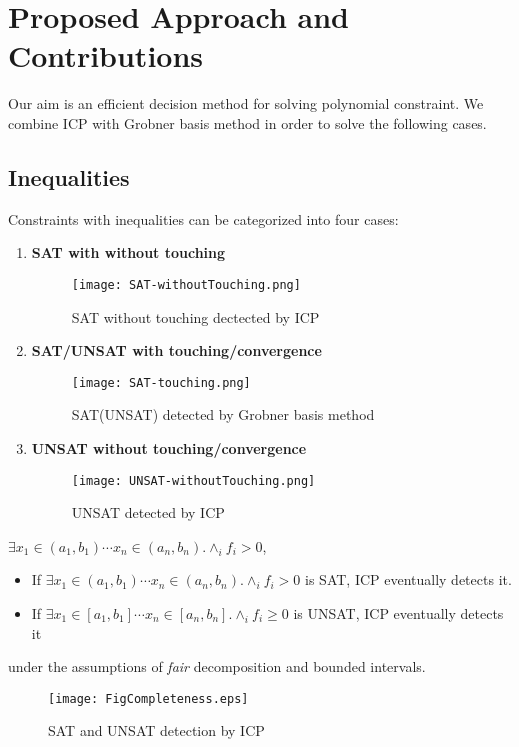 \section{Proposed Approach and Contributions}
Our aim is an efficient decision method for solving polynomial constraint. We combine ICP with Grobner basis method in order to solve the following cases.
\subsection{Inequalities}
Constraints with inequalities can be categorized into four cases:
\begin{enumerate}
\item \textbf{SAT with without touching}
\begin{figure}[ht]
\centering
\texttt{[image: SAT-withoutTouching.png]} 
\caption{SAT without touching dectected by ICP} 
\label{fig:sat-withoutTouching} 
\end{figure} 

\item \textbf{SAT/UNSAT with touching/convergence}
\begin{figure}[ht]
\centering
\texttt{[image: SAT-touching.png]} 
\caption{SAT(UNSAT) detected by Grobner basis method} 
\label{fig:sat-touching} 
\end{figure} 

\item \textbf{UNSAT without touching/convergence}
\begin{figure}[ht]
\centering
\texttt{[image: UNSAT-withoutTouching.png]} 
\caption{UNSAT detected by ICP} 
\label{fig:unsat-withoutTouching} 
\end{figure} 
\end{enumerate}
$\exists x_1 \in (a_1,b_1) \cdots x_n \in (a_n,b_n) . \wedge_{i} f_i > 0$, 
\begin{itemize}
\item If $\exists x_1 \in (a_1,b_1) \cdots x_n \in (a_n,b_n) . \wedge_{i} f_i > 0$ is SAT, 
ICP eventually detects it. 
\item If $\exists x_1 \in [a_1,b_1] \cdots x_n \in [a_n,b_n] . \wedge_{i} f_i \geq 0$ is UNSAT, 
ICP eventually detects it
\end{itemize}
under the assumptions of {\em fair} decomposition and bounded intervals. 
\begin{figure}[ht]
\centering
\texttt{[image: FigCompleteness.eps]} 
\caption{SAT and UNSAT detection by ICP} 
\label{fig:complete} 
\end{figure} 

